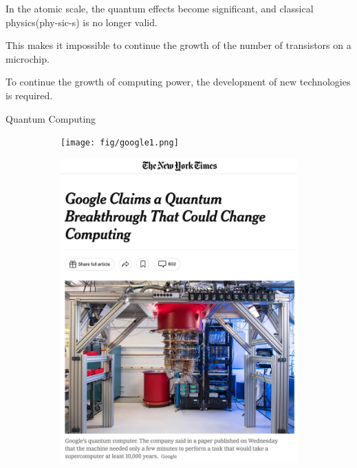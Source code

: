 \documentclass[10pt]{beamer}
\begin{document}
\begin{CJK}{UTF8}{gbsn}
{In the atomic scale, the quantum effects become significant, and classical physics(phy-sic-s) is no longer valid.

This makes it impossible to continue the growth of the number of transistors on a microchip.

To continue the growth of computing power, the development of new technologies is required.


}


\begin{frame}[fragile]{Quantum Computing}
\begin{figure}
  \centering
  \begin{subfigure}[b]{0.2\textwidth}
    \texttt{[image: fig/google1.png]}
  \end{subfigure}
  \hfill
  \begin{subfigure}[b]{0.3\textwidth}
    \includegraphics[width=\textwidth]{fig/newyorktimes.png}

\end{subfigure}
\end{figure}
\end{frame}
\end{CJK}
\end{document}
